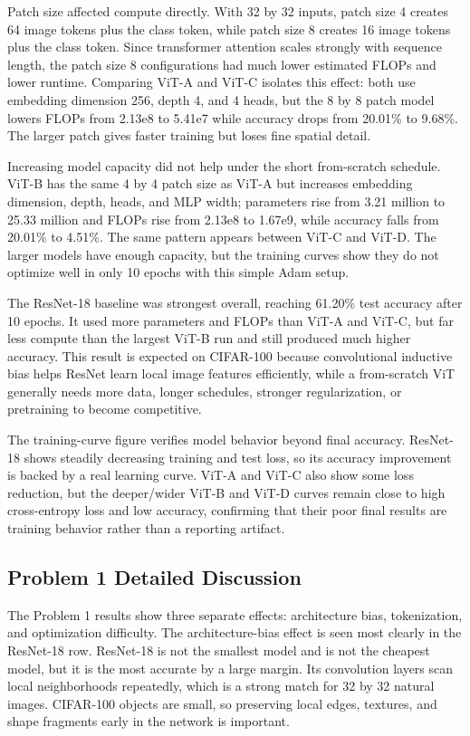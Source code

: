 \documentclass[11pt]{article}
\begin{document}
Patch size affected compute directly. With 32 by 32 inputs, patch size 4 creates 64 image tokens plus the class token, while patch size 8 creates 16 image tokens plus the class token. Since transformer attention scales strongly with sequence length, the patch size 8 configurations had much lower estimated FLOPs and lower runtime. Comparing ViT-A and ViT-C isolates this effect: both use embedding dimension 256, depth 4, and 4 heads, but the 8 by 8 patch model lowers FLOPs from 2.13e8 to 5.41e7 while accuracy drops from 20.01\% to 9.68\%. The larger patch gives faster training but loses fine spatial detail.

Increasing model capacity did not help under the short from-scratch schedule. ViT-B has the same 4 by 4 patch size as ViT-A but increases embedding dimension, depth, heads, and MLP width; parameters rise from 3.21 million to 25.33 million and FLOPs rise from 2.13e8 to 1.67e9, while accuracy falls from 20.01\% to 4.51\%. The same pattern appears between ViT-C and ViT-D. The larger models have enough capacity, but the training curves show they do not optimize well in only 10 epochs with this simple Adam setup.

The ResNet-18 baseline was strongest overall, reaching 61.20\% test accuracy after 10 epochs. It used more parameters and FLOPs than ViT-A and ViT-C, but far less compute than the largest ViT-B run and still produced much higher accuracy. This result is expected on CIFAR-100 because convolutional inductive bias helps ResNet learn local image features efficiently, while a from-scratch ViT generally needs more data, longer schedules, stronger regularization, or pretraining to become competitive.

The training-curve figure verifies model behavior beyond final accuracy. ResNet-18 shows steadily decreasing training and test loss, so its accuracy improvement is backed by a real learning curve. ViT-A and ViT-C also show some loss reduction, but the deeper/wider ViT-B and ViT-D curves remain close to high cross-entropy loss and low accuracy, confirming that their poor final results are training behavior rather than a reporting artifact.

\subsection*{Problem 1 Detailed Discussion}
The Problem 1 results show three separate effects: architecture bias, tokenization, and optimization difficulty. The architecture-bias effect is seen most clearly in the ResNet-18 row. ResNet-18 is not the smallest model and is not the cheapest model, but it is the most accurate by a large margin. Its convolution layers scan local neighborhoods repeatedly, which is a strong match for 32 by 32 natural images. CIFAR-100 objects are small, so preserving local edges, textures, and shape fragments early in the network is important.
\end{document}
